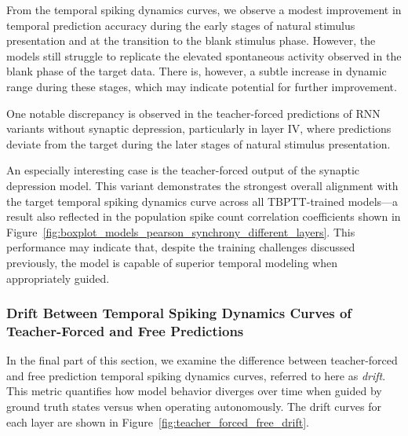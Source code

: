 From the temporal spiking dynamics curves, we observe a modest improvement in temporal prediction accuracy during the early stages of natural stimulus presentation and at the transition to the blank stimulus phase. However, the models still struggle to replicate the elevated spontaneous activity observed in the blank phase of the target data. There is, however, a subtle increase in dynamic range during these stages, which may indicate potential for further improvement.

One notable discrepancy is observed in the teacher-forced predictions of RNN variants without synaptic depression, particularly in layer IV, where predictions deviate from the target during the later stages of natural stimulus presentation. 

An especially interesting case is the teacher-forced output of the synaptic depression model. This variant demonstrates the strongest overall alignment with the target temporal spiking dynamics curve across all TBPTT-trained models—a result also reflected in the population spike count correlation coefficients shown in Figure~\ref{fig:boxplot_models_pearson_synchrony_different_layers}. This performance may indicate that, despite the training challenges discussed previously, the model is capable of superior temporal modeling when appropriately guided.

\subsubsection{Drift Between Temporal Spiking Dynamics Curves of Teacher-Forced and Free Predictions}
\label{subsubsec:drift_teacher_free_synchrony}

In the final part of this section, we examine the difference between teacher-forced and free prediction temporal spiking dynamics curves, referred to here as \emph{drift}. This metric quantifies how model behavior diverges over time when guided by ground truth states versus when operating autonomously. The drift curves for each layer are shown in Figure~\ref{fig:teacher_forced_free_drift}.

